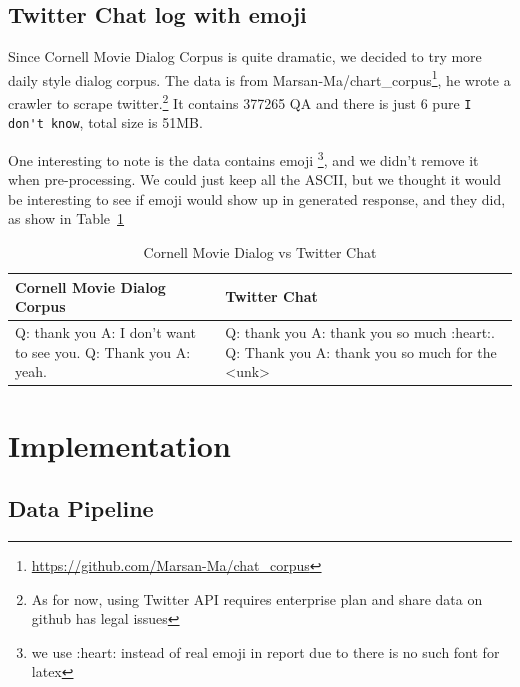 \documentclass{article}
\begin{document}
\subsection{Twitter Chat log with emoji}
\label{subsec:twitter}

Since Cornell Movie Dialog Corpus is quite dramatic, we decided to try more daily style dialog corpus.
The data is from Marsan-Ma/chart\_corpus\footnote{\url{https://github.com/Marsan-Ma/chat\_corpus}}, he wrote
a crawler to scrape twitter.\footnote{As for now, using Twitter API requires enterprise plan and share data on github has legal issues}
It contains 377265 QA and there is just 6 pure \verb+I don't know+, total size is 51MB.

One interesting to note is the data contains emoji \footnote{we use :heart: instead of real emoji in report due to there is no such font for latex},
and we didn't remove it when pre-processing.
We could just keep all the ASCII, but we thought it would be interesting to see if emoji would show up in generated response,
and they did, as show in Table~\ref{table:cornell-twitter}

\begin{table}[h]
    \caption{Cornell Movie Dialog vs Twitter Chat}
    \label{table:cornell-twitter}
    \centering
\begin{tabular}{p{70mm}|p{70mm}}
  \toprule
  Cornell Movie Dialog Corpus & Twitter Chat\\
  \hline
  Q: thank you \newline
A: I don't want to see you. \newline
Q: Thank you \newline
A: yeah.
  &
Q: thank you \newline
A: thank you so much :heart:️. \newline
Q: Thank you \newline
A: thank you so much for the <unk>
  \\
  \bottomrule
\end{tabular}
\end{table}

\section{Implementation}
\label{sec:implementation}

\subsection{Data Pipeline}
\label{subsec:data-pipeline}
\end{document}
